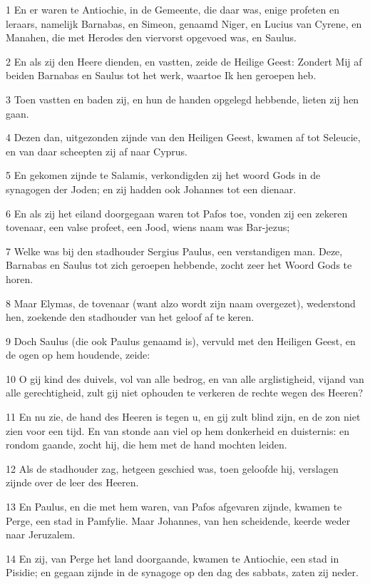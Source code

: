 \par 1 En er waren te Antiochie, in de Gemeente, die daar was, enige profeten en leraars, namelijk Barnabas, en Simeon, genaamd Niger, en Lucius van Cyrene, en Manahen, die met Herodes den viervorst opgevoed was, en Saulus.
\par 2 En als zij den Heere dienden, en vastten, zeide de Heilige Geest: Zondert Mij af beiden Barnabas en Saulus tot het werk, waartoe Ik hen geroepen heb.
\par 3 Toen vastten en baden zij, en hun de handen opgelegd hebbende, lieten zij hen gaan.
\par 4 Dezen dan, uitgezonden zijnde van den Heiligen Geest, kwamen af tot Seleucie, en van daar scheepten zij af naar Cyprus.
\par 5 En gekomen zijnde te Salamis, verkondigden zij het woord Gods in de synagogen der Joden; en zij hadden ook Johannes tot een dienaar.
\par 6 En als zij het eiland doorgegaan waren tot Pafos toe, vonden zij een zekeren tovenaar, een valse profeet, een Jood, wiens naam was Bar-jezus;
\par 7 Welke was bij den stadhouder Sergius Paulus, een verstandigen man. Deze, Barnabas en Saulus tot zich geroepen hebbende, zocht zeer het Woord Gods te horen.
\par 8 Maar Elymas, de tovenaar (want alzo wordt zijn naam overgezet), wederstond hen, zoekende den stadhouder van het geloof af te keren.
\par 9 Doch Saulus (die ook Paulus genaamd is), vervuld met den Heiligen Geest, en de ogen op hem houdende, zeide:
\par 10 O gij kind des duivels, vol van alle bedrog, en van alle arglistigheid, vijand van alle gerechtigheid, zult gij niet ophouden te verkeren de rechte wegen des Heeren?
\par 11 En nu zie, de hand des Heeren is tegen u, en gij zult blind zijn, en de zon niet zien voor een tijd. En van stonde aan viel op hem donkerheid en duisternis: en rondom gaande, zocht hij, die hem met de hand mochten leiden.
\par 12 Als de stadhouder zag, hetgeen geschied was, toen geloofde hij, verslagen zijnde over de leer des Heeren.
\par 13 En Paulus, en die met hem waren, van Pafos afgevaren zijnde, kwamen te Perge, een stad in Pamfylie. Maar Johannes, van hen scheidende, keerde weder naar Jeruzalem.
\par 14 En zij, van Perge het land doorgaande, kwamen te Antiochie, een stad in Pisidie; en gegaan zijnde in de synagoge op den dag des sabbats, zaten zij neder.
